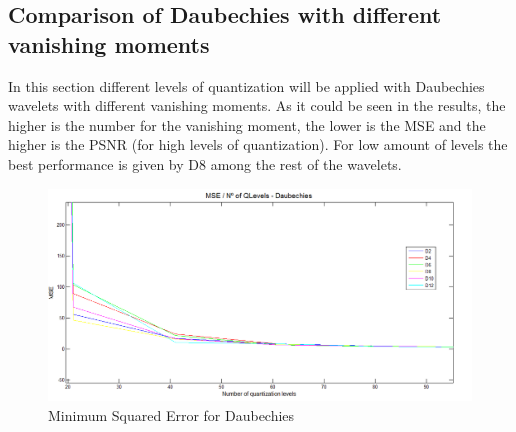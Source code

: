 \documentclass[a4paper, 10pt, conference] {article}
\begin{document}
 
 \subsection{Comparison of Daubechies with different vanishing moments}
 In this section different levels of quantization will be applied with Daubechies wavelets with different vanishing moments. As it could be seen in the results, the higher is the number for the vanishing moment, the lower is the MSE and the higher is the PSNR (for high levels of quantization). For low amount of levels the best performance is given by D8 among the rest of the wavelets.
 \begin{figure}[H]
 	\centering
 	\includegraphics[scale=0.35]{reportImages/MSE_Daubechies.PNG}
 	\caption{Minimum Squared Error for Daubechies}
 	\label{MSEd}
 \end{figure}
\end{document}
